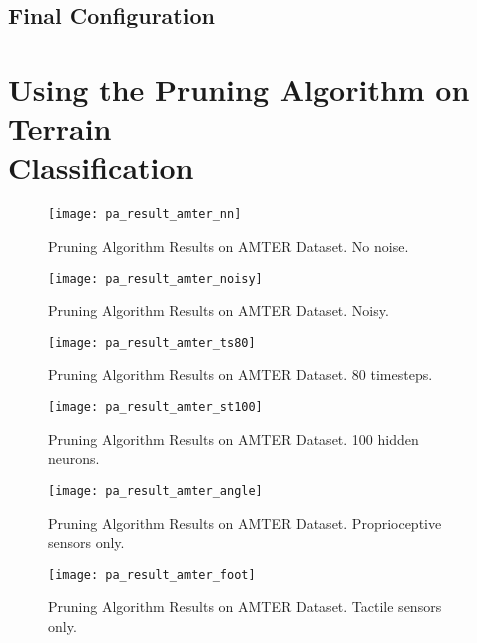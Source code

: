 \subsection{Final Configuration} \label{ssec:results_overview}


\section[Using the Pruning Algorithm on Terrain Classification]{Using the Pruning Algorithm on Terrain \\Classification} \label{sec:pa_amter}

\begin{figure}[H]
  \centering
  \texttt{[image: pa\_result\_amter\_nn]}
  \caption{Pruning Algorithm Results on AMTER Dataset. No noise.}
  \label{fig:pa_result_amter}
\end{figure}

\begin{figure}[H]
  \centering
  \texttt{[image: pa\_result\_amter\_noisy]}
  \caption{Pruning Algorithm Results on AMTER Dataset. Noisy.}
  \label{fig:pa_result_amter_noisy}
\end{figure}

\begin{figure}[H]
  \centering
  \texttt{[image: pa\_result\_amter\_ts80]}
  \caption{Pruning Algorithm Results on AMTER Dataset. 80 timesteps.}
  \label{fig:pa_result_amter_80}
\end{figure}

\begin{figure}[H]
  \centering
  \texttt{[image: pa\_result\_amter\_st100]}
  \caption{Pruning Algorithm Results on AMTER Dataset. 100 hidden neurons.}
  \label{fig:pa_result_amter_st100}
\end{figure}

\begin{figure}[H]
  \centering
  \texttt{[image: pa\_result\_amter\_angle]}
  \caption{Pruning Algorithm Results on AMTER Dataset. Proprioceptive sensors only.}
  \label{fig:pa_result_amter_angle}
\end{figure}

\begin{figure}[H]
  \centering
  \texttt{[image: pa\_result\_amter\_foot]}
  \caption{Pruning Algorithm Results on AMTER Dataset. Tactile sensors only.}
  \label{fig:pa_result_amter_foot}
\end{figure}

